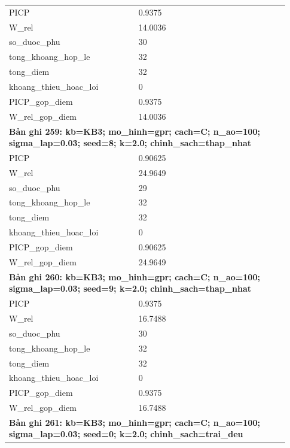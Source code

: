 \begin{longtable}{p{0.43\linewidth}p{0.50\linewidth}}
PICP & 0.9375 \\
W\_\allowbreak rel & 14.0036 \\
so\_\allowbreak duoc\_\allowbreak phu & 30 \\
tong\_\allowbreak khoang\_\allowbreak hop\_\allowbreak le & 32 \\
tong\_\allowbreak diem & 32 \\
khoang\_\allowbreak thieu\_\allowbreak hoac\_\allowbreak loi & 0 \\
PICP\_\allowbreak gop\_\allowbreak diem & 0.9375 \\
W\_\allowbreak rel\_\allowbreak gop\_\allowbreak diem & 14.0036 \\
\midrule
\multicolumn{2}{p{0.95\linewidth}}{\textbf{Bản ghi 259: kb=KB3; mo\_hinh=gpr; cach=C; n\_ao=100; sigma\_lap=0.03; seed=8; k=2.0; chinh\_sach=thap\_nhat}} \\
PICP & 0.90625 \\
W\_\allowbreak rel & 24.9649 \\
so\_\allowbreak duoc\_\allowbreak phu & 29 \\
tong\_\allowbreak khoang\_\allowbreak hop\_\allowbreak le & 32 \\
tong\_\allowbreak diem & 32 \\
khoang\_\allowbreak thieu\_\allowbreak hoac\_\allowbreak loi & 0 \\
PICP\_\allowbreak gop\_\allowbreak diem & 0.90625 \\
W\_\allowbreak rel\_\allowbreak gop\_\allowbreak diem & 24.9649 \\
\midrule
\multicolumn{2}{p{0.95\linewidth}}{\textbf{Bản ghi 260: kb=KB3; mo\_hinh=gpr; cach=C; n\_ao=100; sigma\_lap=0.03; seed=9; k=2.0; chinh\_sach=thap\_nhat}} \\
PICP & 0.9375 \\
W\_\allowbreak rel & 16.7488 \\
so\_\allowbreak duoc\_\allowbreak phu & 30 \\
tong\_\allowbreak khoang\_\allowbreak hop\_\allowbreak le & 32 \\
tong\_\allowbreak diem & 32 \\
khoang\_\allowbreak thieu\_\allowbreak hoac\_\allowbreak loi & 0 \\
PICP\_\allowbreak gop\_\allowbreak diem & 0.9375 \\
W\_\allowbreak rel\_\allowbreak gop\_\allowbreak diem & 16.7488 \\
\midrule
\multicolumn{2}{p{0.95\linewidth}}{\textbf{Bản ghi 261: kb=KB3; mo\_hinh=gpr; cach=C; n\_ao=100; sigma\_lap=0.03; seed=0; k=2.0; chinh\_sach=trai\_deu}} \\

\end{longtable}
